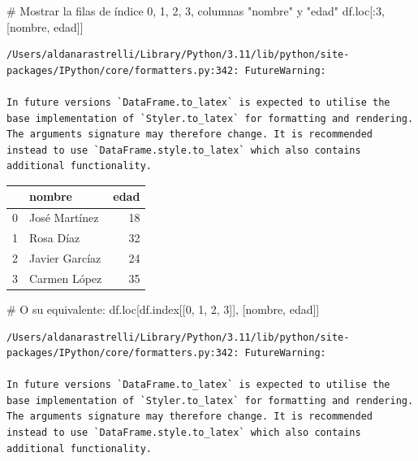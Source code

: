 \documentclass[
  letterpaper,
  DIV=11,
  numbers=noendperiod]{scrreprt}
\newenvironment{Shaded}{\begin{snugshade}}{\end{snugshade}}
\newcommand{\CommentTok}[1]{\textcolor[rgb]{0.37,0.37,0.37}{#1}}
\newcommand{\DecValTok}[1]{\textcolor[rgb]{0.68,0.00,0.00}{#1}}
\newcommand{\NormalTok}[1]{\textcolor[rgb]{0.00,0.23,0.31}{#1}}
\newcommand{\StringTok}[1]{\textcolor[rgb]{0.13,0.47,0.30}{#1}}
\begin{document}
\begin{Shaded}
\begin{Highlighting}[]
\CommentTok{\# Mostrar la filas de índice 0, 1, 2, 3, columnas "nombre" y "edad"}
\NormalTok{df.loc[:}\DecValTok{3}\NormalTok{, [}\StringTok{\textquotesingle{}nombre\textquotesingle{}}\NormalTok{, }\StringTok{\textquotesingle{}edad\textquotesingle{}}\NormalTok{]]}
\end{Highlighting}
\end{Shaded}

\begin{verbatim}
/Users/aldanarastrelli/Library/Python/3.11/lib/python/site-packages/IPython/core/formatters.py:342: FutureWarning:

In future versions `DataFrame.to_latex` is expected to utilise the base implementation of `Styler.to_latex` for formatting and rendering. The arguments signature may therefore change. It is recommended instead to use `DataFrame.style.to_latex` which also contains additional functionality.
\end{verbatim}

\begin{tabular}{llr}
\toprule
{} &          nombre &  edad \\
\midrule
0 &   José Martínez &    18 \\
1 &       Rosa Díaz &    32 \\
2 &  Javier Garcíaz &    24 \\
3 &    Carmen López &    35 \\
\bottomrule
\end{tabular}

\begin{Shaded}
\begin{Highlighting}[]
\CommentTok{\# O su equivalente:}
\NormalTok{df.loc[df.index[[}\DecValTok{0}\NormalTok{, }\DecValTok{1}\NormalTok{, }\DecValTok{2}\NormalTok{, }\DecValTok{3}\NormalTok{]], [}\StringTok{\textquotesingle{}nombre\textquotesingle{}}\NormalTok{, }\StringTok{\textquotesingle{}edad\textquotesingle{}}\NormalTok{]]}
\end{Highlighting}
\end{Shaded}

\begin{verbatim}
/Users/aldanarastrelli/Library/Python/3.11/lib/python/site-packages/IPython/core/formatters.py:342: FutureWarning:

In future versions `DataFrame.to_latex` is expected to utilise the base implementation of `Styler.to_latex` for formatting and rendering. The arguments signature may therefore change. It is recommended instead to use `DataFrame.style.to_latex` which also contains additional functionality.
\end{verbatim}
\end{document}
